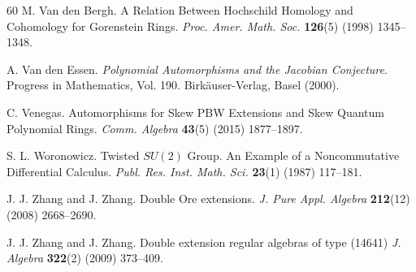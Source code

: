 \documentclass{amsart}
\theoremstyle{definition}
\theoremstyle{remark}
\numberwithin{equation}{section}
\begin{document}
\begin{thebibliography}{60}
 M. Van den Bergh. A Relation Between Hochschild Homology and Cohomology for Gorenstein Rings. {\em Proc. Amer. Math. Soc.} {\bf 126}(5) (1998) 1345--1348.

 A. Van den Essen. {\em Polynomial {A}utomorphisms and the {J}acobian {C}onjecture}. Progress in Mathematics, Vol. 190. Birk\"auser-Verlag, Basel (2000).

 C. Venegas. Automorphisms for Skew PBW Extensions and Skew Quantum Polynomial Rings. {\em Comm. Algebra} {\bf 43}(5) (2015) 1877--1897.

 S. L. Woronowicz. Twisted $SU(2)$ {G}roup. An {E}xample of a {N}oncommutative {D}ifferential {C}alculus. {\em Publ. Res. Inst. Math. Sci.} {\bf 23}(1) (1987) 117--181.

 J. J. Zhang and J. Zhang. Double Ore extensions. {\em J. Pure Appl. Algebra} {\bf 212}(12) (2008) 2668--2690.

 J. J. Zhang and J. Zhang. Double extension regular algebras of type (14641) {\em J. Algebra} {\bf 322}(2) (2009) 373--409.

\end{thebibliography}
\end{document}
